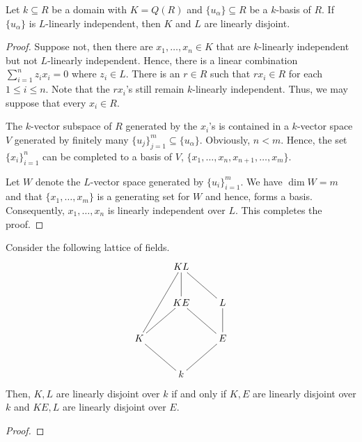 \begin{proposition}
    Let $k\subseteq R$ be a domain with $K = Q(R)$ and $\{u_\alpha\}\subseteq R$ be a $k$-basis of $R$. If $\{u_\alpha\}$ is $L$-linearly independent, then $K$ and $L$ are linearly disjoint.
\end{proposition}
\begin{proof}
    Suppose not, then there are $x_1,\dots,x_n\in K$ that are $k$-linearly independent but not $L$-linearly independent. Hence, there is a linear combination $\sum_{i = 1}^n z_ix_i = 0$ where $z_i\in L$. There is an $r\in R$ such that $rx_i\in R$ for each $1\le i\le n$. Note that the $rx_i$'s still remain $k$-linearly independent. Thus, we may suppose that every $x_i\in R$.

    The $k$-vector subspace of $R$ generated by the $x_i$'s is contained in a $k$-vector space $V$ generated by finitely many $\{u_j\}_{j = 1}^m\subseteq\{u_\alpha\}$. Obviously, $n < m$. Hence, the set $\{x_i\}_{i = 1}^n$ can be completed to a basis of $V$, $\{x_1,\dots,x_n, x_{n + 1},\dots,x_m\}$. 

    Let $W$ denote the $L$-vector space generated by $\{u_i\}_{i = 1}^m$. We have $\dim W = m$ and that $\{x_1,\dots,x_m\}$ is a generating set for $W$ and hence, forms a basis. Consequently, $x_1,\dots,x_n$ is linearly independent over $L$. This completes the proof.
\end{proof}

\begin{theorem}
    Consider the following lattice of fields.
    \begin{equation*}
    \xymatrix {
        & KL\ar@{-}[ldd]\ar@{-}[d]\ar@{-}[rd] & \\
        & KE\ar@{-}[ld]\ar@{-}[rd] & L\ar@{-}[d]\\
        K\ar@{-}[rd] & & E\ar@{-}[ld]\\
        & k &
    }
    \end{equation*}
    Then, $K, L$ are linearly disjoint over $k$ if and only if $K, E$ are linearly disjoint over $k$ and $KE, L$ are linearly disjoint over $E$.
\end{theorem}
\begin{proof}
\end{proof}

